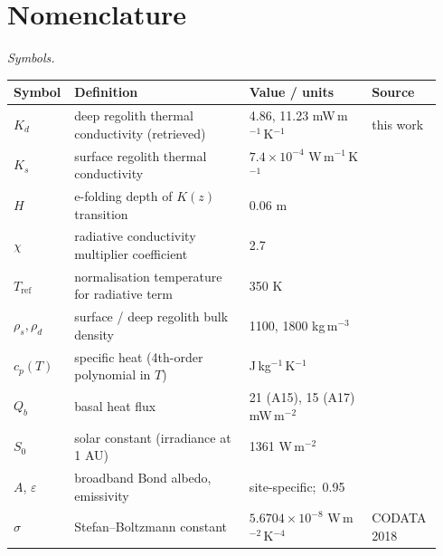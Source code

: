 \documentclass[11pt]{article}
\renewcommand{\arraystretch}{1.15}
\begin{document}
\section*{Nomenclature}
\label{sec:nomenclature}
{\small
\setlength{\tabcolsep}{4pt}
\renewcommand{\arraystretch}{1.0}

\noindent\textit{Symbols.}\par\smallskip\noindent
\begin{tabular}{@{}p{0.10\linewidth}p{0.40\linewidth}p{0.28\linewidth}p{0.16\linewidth}@{}}
\toprule
\textbf{Symbol} & \textbf{Definition} & \textbf{Value / units} & \textbf{Source} \\
\midrule
$K_d$              & deep regolith thermal conductivity (retrieved)        & 4.86, 11.23 mW\,m$^{-1}$\,K$^{-1}$         & this work \\
$K_s$              & surface regolith thermal conductivity                  & $7.4\times10^{-4}$ W\,m$^{-1}$\,K$^{-1}$  & \citet{hayne2017} \\
$H$                & e-folding depth of $K(z)$ transition                  & 0.06 m                                       & \citet{hayne2017} \\
$\chi$             & radiative conductivity multiplier coefficient         & 2.7                                          & \citet{hayne2017} \\
$T_\mathrm{ref}$   & normalisation temperature for radiative term          & 350 K                                        & \citet{hayne2017} \\
$\rho_s,\rho_d$    & surface / deep regolith bulk density                  & 1100, 1800 kg\,m$^{-3}$                      & \citet{hayne2017} \\
$c_p(T)$           & specific heat (4th-order polynomial in $T$)           & J\,kg$^{-1}$\,K$^{-1}$                       & \citet{hemingway1973,hayne2017} \\
$Q_b$              & basal heat flux                                       & 21 (A15), 15 (A17) mW\,m$^{-2}$              & \citet{langseth1976,nagihara2018} \\
$S_0$              & solar constant (irradiance at 1 AU)                   & 1361 W\,m$^{-2}$                             & \citet{kopp2011} \\
$A$, $\varepsilon$ & broadband Bond albedo, emissivity                     & site-specific;\ 0.95                         & \citet{vasavada2012,bandfield2015} \\
$\sigma$           & Stefan--Boltzmann constant                            & $5.6704\!\times\!10^{-8}$ W\,m$^{-2}$\,K$^{-4}$ & CODATA 2018 \\

\end{tabular}}
\end{document}
